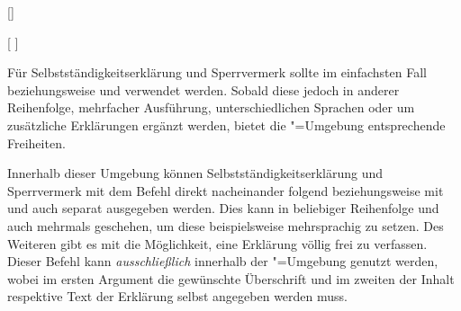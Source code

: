 \begin{Declaration*}{}
\begin{Declaration*}{}
\begin{Declaration*}{}
\begin{Declaration}{[]}
\begin{Declaration}{%
  [%
  ]%
}
\begin{Declaration}{}
\begin{Declaration}{}
\begin{Declaration}{%
}
\begin{Declaration}{%
}
\begin{Declaration}{}
\begin{Declaration}{%
}
\begin{Declaration}{}
\begin{Declaration}{}
\begin{Declaration}{}
\printdeclarationlist%
%
Für Selbstständigkeitserklärung und Sperrvermerk sollte im einfachsten Fall 
 beziehungsweise  und  
verwendet werden. Sobald diese jedoch in anderer Reihenfolge, mehrfacher 
Ausführung, unterschiedlichen Sprachen oder um zusätzliche Erklärungen ergänzt 
werden, bietet die "=Umgebung entsprechende 
Freiheiten.

Innerhalb dieser Umgebung können Selbstständigkeitserklärung und Sperrvermerk 
mit dem Befehl  direkt nacheinander folgend beziehungsweise 
mit  und  auch separat ausgegeben werden. 
Dies kann in beliebiger Reihenfolge und auch mehrmals geschehen, um diese 
beispielsweise mehrsprachig zu setzen.
 Des Weiteren gibt es mit  die 
Möglichkeit, eine Erklärung völlig frei zu verfassen. Dieser Befehl kann 
\emph{ausschließlich} innerhalb der "=Umgebung 
genutzt werden, wobei im ersten Argument die gewünschte Überschrift und im 
zweiten der Inhalt respektive Text der Erklärung selbst angegeben werden muss.


\end{Declaration}
\end{Declaration}
\end{Declaration}
\end{Declaration}
\end{Declaration}
\end{Declaration}
\end{Declaration}
\end{Declaration}
\end{Declaration}
\end{Declaration}
\end{Declaration}
\end{Declaration*}
\end{Declaration*}
\end{Declaration*}
